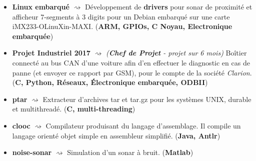 \documentclass[letterpaper]{twentysecondcv} %
\begin{document}
\begin{itemize}

    
    \item \textbf{Linux embarqué} $\rightsquigarrow$ {Développement de \textbf{drivers} pour sonar de proximité et afficheur 7-segments à 3 digits pour un Debian embarqué sur une carte iMX233-OLinuXin-MAXI. (\textbf{ARM, GPIOs, C Noyau, Electronique embarquée})}
    \item \textbf{Projet Industriel 2017} $\rightsquigarrow$ \textit{(\textbf{Chef de Projet} - projet sur 6 mois)} Boîtier connecté au bus CAN d’une voiture afin d’en effectuer le diagnostic en cas de panne (et envoyer ce rapport par GSM), pour le compte de la société \textit{Clarion}. (\textbf{C, Python, Réseaux, Électronique embarquée, ODBII})
    \item \textbf{ptar} $\rightsquigarrow$ Extracteur d'archives tar et tar.gz pour les systèmes UNIX, durable et multithreadé. (\textbf{C, multi-threading})
    \item \textbf{clooc} $\rightsquigarrow$ Compilateur produisant du langage d'assemblage. Il compile un langage orienté objet simple en assembleur simplifié. (\textbf{Java, Antlr})
    \item \textbf{noise-sonar} $\rightsquigarrow$ Simulation d'un sonar à bruit. (\textbf{Matlab})
    
    
    
\end{itemize}


\end{document}

